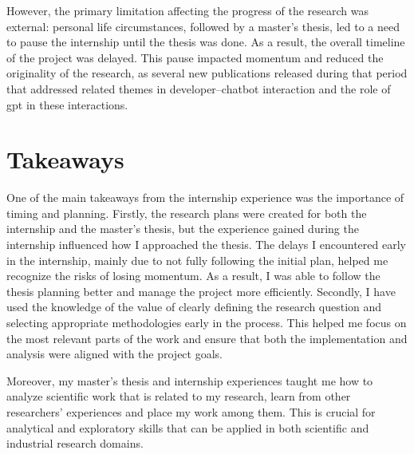 However, the primary limitation affecting the progress of the research was external: personal life circumstances, followed by a master's thesis, led to a need to pause the internship until the thesis was done. As a result, the overall timeline of the project was delayed. This pause impacted momentum and reduced the originality of the research, as several new publications released during that period that addressed related themes in developer–chatbot interaction and the role of \acrshort{gpt} in these interactions.

\section{Takeaways}
One of the main takeaways from the internship experience was the importance of timing and planning. Firstly, the research plans were created for both the internship and the master's thesis, but the experience gained during the internship influenced how I approached the thesis. The delays I encountered early in the internship, mainly due to not fully following the initial plan, helped me recognize the risks of losing momentum. As a result, I was able to follow the thesis planning better and manage the project more efficiently. Secondly, I have used the knowledge of the value of clearly defining the research question and selecting appropriate methodologies early in the process. This helped me focus on the most relevant parts of the work and ensure that both the implementation and analysis were aligned with the project goals.

Moreover, my master's thesis and internship experiences taught me how to analyze scientific work that is related to my research, learn from other researchers' experiences and place my work among them. This is crucial for analytical and exploratory skills that can be applied in both scientific and industrial research domains. 